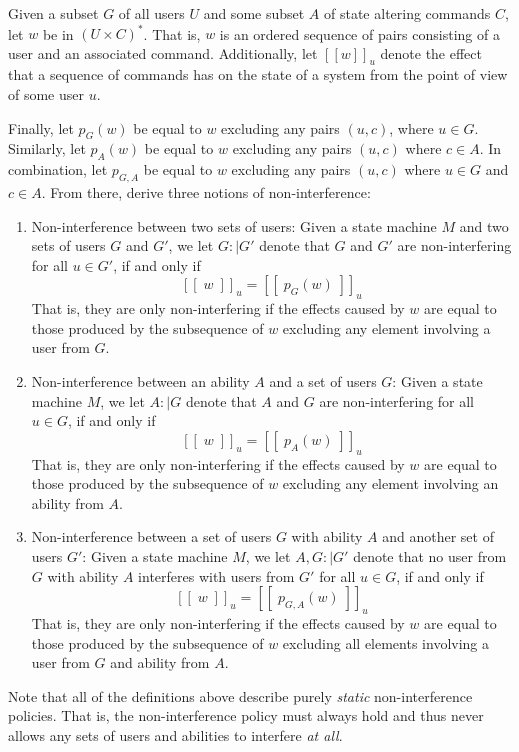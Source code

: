 Given a subset \(G\) of all users \(U\) and some subset \(A\) of state altering commands \(C\), let \(w\) be in \((U \times C)^*\). That is, \(w\) is an ordered sequence of pairs consisting of a user and an associated command. Additionally, let \([[w]]_u\) denote the effect that a sequence of commands has on the state of a system from the point of view of some user \(u\).

Finally, let \(p_G(w)\) be equal to \(w\) excluding any pairs \((u,c)\), where \(u \in G\). Similarly, let \(p_A(w)\) be equal to \(w\) excluding any pairs \((u,c)\) where \(c \in A\). In combination, let \(p_{G,A}\) be equal to \(w\) excluding any pairs \((u,c)\) where \(u \in G\) and \(c \in A\).
From there, \citeauthor{Goguen_Meseguer_82} derive three notions of non-interference:
\begin{enumerate}
    \item Non-interference between two sets of users: Given a state machine \(M\) and two sets of users \(G\) and \(G'\), we let \(G :\mid G'\) denote that \(G\) and \(G'\) are non-interfering for all \(u \in G'\), if and only if \[ 
        [[\;w\;]]_u = [[\;p_G(w)\;]]_u  
    \]
    That is, they are only non-interfering if the effects caused by \(w\) are equal to those produced by the subsequence of \(w\) excluding any element involving a user from \(G\).
    \item Non-interference between an ability \(A\) and a set of users \(G\): Given a state machine \(M\), we let \(A :\mid G\) denote that \(A\) and \(G\) are non-interfering for all \(u \in G\), if and only if  \[
        [[\;w\;]]_u = [[\;p_A(w)\;]]_u  
    \]
    That is, they are only non-interfering if the effects caused by \(w\) are equal to those produced by the subsequence of \(w\) excluding any element involving an ability from \(A\).
    \item Non-interference between a set of users \(G\) with ability \(A\) and another set of users \(G'\): Given a state machine \(M\), we let \(A,G :\mid G'\) denote that no user from \(G\) with ability \(A\) interferes with users from \(G'\) for all \(u \in G\), if and only if \[
        [[\;w\;]]_u = [[\;p_{G,A}(w)\;]]_u   
    \]
    That is, they are only non-interfering if the effects caused by \(w\) are equal to those produced by the subsequence of \(w\) excluding all elements involving a user from \(G\) and ability from \(A\).
\end{enumerate}

Note that all of the definitions above describe purely \emph{static} non-interference policies. That is, the non-interference policy must always hold and thus never allows any sets of users and abilities to interfere \emph{at all}. 

